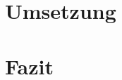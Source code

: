 \documentclass[12pt,a4paper,bibliography=totocnumbered,listof=totoc]{scrartcl}
\begin{document}
\pagebreak

\section{Umsetzung}

\pagebreak

\section{Fazit}

\pagebreak






\end{document}
